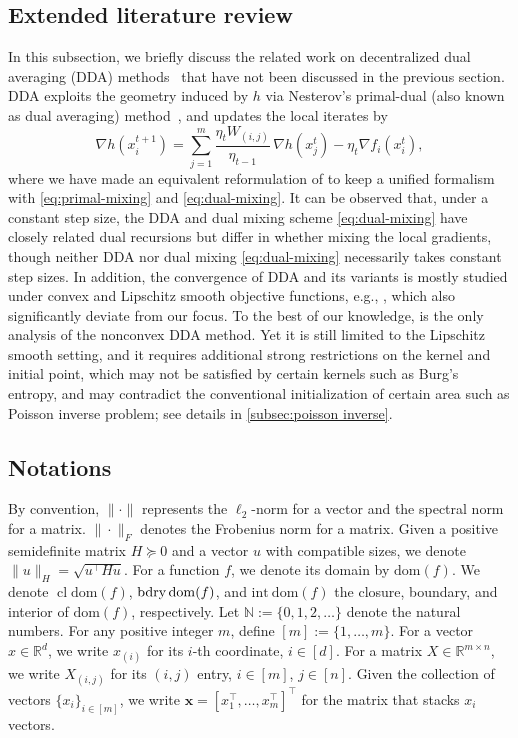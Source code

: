 \documentclass{article}
\theoremstyle{plain}
\theoremstyle{definition}
\theoremstyle{remark}
\newcommand{\cl}{\operatorname{cl}}
\newcommand{\N}{\mathbb{N}}
\newcommand{\bx}{\mathbf{x}}
\newcommand{\dom}[1]{\mathrm{dom}(#1)}
\newcommand{\idom}[1]{\mathrm{int\ dom}(#1)}
\begin{document}
\subsection{Extended literature review}
In this subsection, we briefly discuss the related work on decentralized dual averaging ({\sf DDA}) methods~\cite{duchi2011dual} that have not been discussed in the previous section. {\sf DDA} exploits the geometry induced by $h$ via Nesterov's primal-dual (also known as dual averaging) method~\cite{nesterov2009primal}, and updates the local iterates by
\[
\nabla h(x_i^{t+1}) = {\sum}_{j=1}^m \frac{\eta_t W_{(i,j)}}{\eta_{t-1}}\,\nabla h(x_j^{t}) - \eta_t\nabla f_i(x_i^t),
\]
where we have made an equivalent reformulation of \cite{duchi2011dual} to keep a unified formalism with \eqref{eq:primal-mixing} and \eqref{eq:dual-mixing}. It can be observed that, under a constant step size, the {\sf DDA} and dual mixing scheme \eqref{eq:dual-mixing} 
have closely related dual
recursions but differ in whether mixing the local gradients, though neither {\sf DDA} nor dual mixing \eqref{eq:dual-mixing} necessarily takes constant step sizes. In addition, the convergence of {\sf DDA} and its variants is mostly studied under convex and Lipschitz smooth objective functions, e.g., \cite{duchi2011dual,hosseini2013online,tsianos2012consensus}, which also significantly deviate from our focus. To the best of our knowledge, \cite{liu2023rate} is the only analysis of the nonconvex {\sf DDA} method. Yet it is still limited to the Lipschitz smooth setting, and it requires additional strong restrictions on the kernel and initial point, which may not be satisfied by certain kernels such as Burg's entropy, and may contradict the conventional initialization of certain area such as Poisson inverse problem; see details in \cref{subsec:poisson inverse}. 

\subsection{Notations}  By convention, $\|\cdot\|$ represents the $\ell_2$-norm for a vector and the spectral norm for a matrix. $\|\cdot\|_F$ denotes the Frobenius norm for a matrix. Given a positive semidefinite matrix $H\succeq0$ and a vector $u$ with compatible sizes, we denote $\|u\|_H=\sqrt{u^\top H u}$. For a function $f$, we denote its domain by $\dom{f}$. We denote $\cl \dom{f}$, ${\rm bdry}\,\dom{f}$, and $\idom{f}$ the closure, boundary, and interior of $\dom{f}$, respectively. Let $\N:=\{0,1,2,\ldots\}$ denote the natural numbers. For any positive integer $m$, define $[m]:=\{1,\ldots,m\}$. For a vector $x\in\mathbb{R}^d$, we write $x_{(i)}$ for its $i$-th coordinate, $i\in[d]$. For a matrix $X\in\mathbb{R}^{m\times n}$, we write $X_{(i,j)}$ for its $(i,j)$ entry, $i\in[m]$, $j\in[n]$.
Given the collection of vectors $\{x_i\}_{i\in[m]}$, we write $\bx=[x_1^\top,\ldots,x_m^\top]^\top$ for the matrix that stacks $x_i$ vectors.
\end{document}
